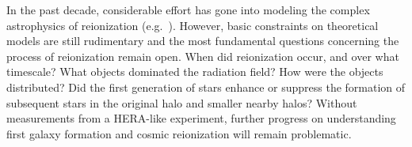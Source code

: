 \documentclass[preprint]{aastex}
\def\HI{{H{\small I }}}
\begin{document}

In the past decade, considerable effort has gone into modeling the complex astrophysics
of reionization (e.g.\ \citealt{santos_et_al2010,mesinger_et_al2011,wyithe_loeb2004}). However,
basic constraints on theoretical models are still rudimentary and the most
fundamental questions concerning the process of reionization remain open.
When did
reionization occur, and over what timescale?  What objects dominated the
radiation field? How were the objects distributed? Did the first generation of
stars enhance or suppress the formation of subsequent stars in the original
halo and smaller nearby halos? Without measurements from a HERA-like experiment,
further progress on understanding first galaxy formation and
cosmic reionization will remain problematic.
\end{document}

